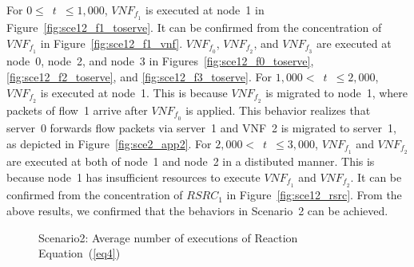 \documentclass[technicalreport]{ieicej}
\begin{document}
	For $0\le$~$t$~$\le1,000$, $\mathit{VNF_{f_1}}$ is executed at node~1 in Figure~\ref{fig:sce12_f1_toserve}.
	It can be confirmed from the concentration of $\mathit{VNF_{f_1}}$ in Figure~\ref{fig:sce12_f1_vnf}.
	$\mathit{VNF_{f_0}}$, $\mathit{VNF_{f_2}}$, and $\mathit{VNF_{f_3}}$ are executed at node~0, node~2, and node~3 in Figures~\ref{fig:sce12_f0_toserve}, \ref{fig:sce12_f2_toserve}, and \ref{fig:sce12_f3_toserve}.
	For $1,000<$~$t$~$\le2,000$, $\mathit{VNF_{f_2}}$ is executed at node~1.
	This is because $\mathit{VNF_{f_2}}$ is migrated to node~1, where packets of flow~1 arrive after $\mathit{VNF_{f_0}}$ is applied.
	This behavior realizes that server~0 forwards flow packets via server~1 and VNF~2 is migrated to server~1, as depicted in Figure~\ref{fig:sce2_app2}.
	For $2,000<$~$t$~$\le3,000$, $\mathit{VNF_{f_1}}$ and $\mathit{VNF_{f_2}}$ are executed at both of node~1 and node~2 in a distibuted manner.
	This is because node~1 has insufficient resources to execute $\mathit{VNF_{f_1}}$ and $\mathit{VNF_{f_2}}$.
	It can be confirmed from the concentration of $\mathit{RSRC_1}$ in Figure~\ref{fig:sce12_rsrc}.
	From the above results, we confirmed that the behaviors in Scenario~2 can be achieved.

	\begin{figure}[!t]
		\begin{center}
			\caption{Scenario2: Average number of executions of Reaction Equation~(\ref{eq4})}
			\label{fig:sce12_toserve}
		\end{center}
	\end{figure}
\end{document}
